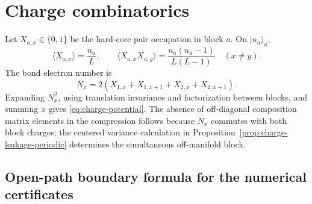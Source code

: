 \documentclass[11pt]{article}
\theoremstyle{definition}
\theoremstyle{remark}
\newcommand{\ket}[1]{\lvert #1\rangle}
\begin{document}
\section{Charge combinatorics}
\label{app:charge}

Let $X_{a,x}\in\{0,1\}$ be the hard-core pair occupation in block $a$.  On $\ket{n_a}_a$,
\begin{equation}
 \langle X_{a,x}\rangle=\frac{n_a}{L},
 \qquad
 \langle X_{a,x}X_{a,y}\rangle=\frac{n_a(n_a-1)}{L(L-1)}
 \quad(x\ne y).
\end{equation}
The bond electron number is
\begin{equation}
 N_x=2(X_{1,x}+X_{1,x+1}+X_{2,x}+X_{2,x+1}).
\end{equation}
Expanding $N_x^2$, using translation invariance and factorization between blocks, and summing $x$ gives \eqref{eq:charge-potential}.  The absence of off-diagonal composition matrix elements in the compression follows because $N_x$ commutes with both block charges; the centered variance calculation in Proposition~\ref{prop:charge-leakage-periodic} determines the simultaneous off-manifold block.

\subsection{Open-path boundary formula for the numerical certificates}
\end{document}
